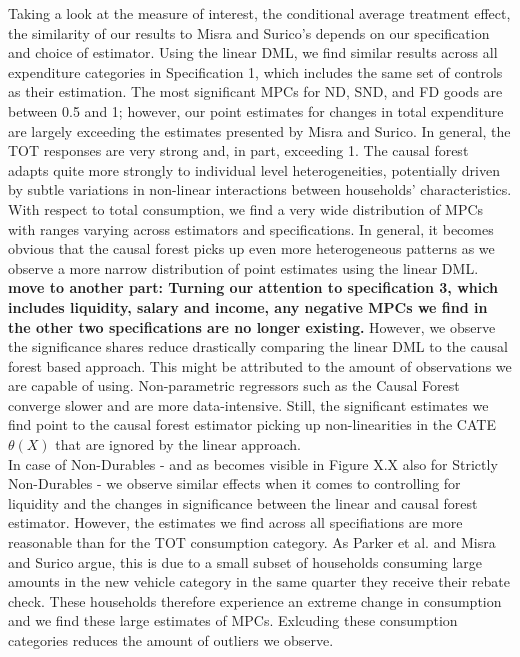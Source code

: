 Taking a look at the measure of interest, the conditional average treatment effect, the similarity of our results to Misra and Surico's depends on our specification and choice of estimator. Using the linear DML, we find similar results across all expenditure categories in Specification 1, which includes the same set of controls as their estimation. The most significant MPCs for ND, SND, and FD goods are between 0.5 and 1; however, our point estimates for changes in total expenditure are largely exceeding the estimates presented by Misra and Surico. In general, the TOT responses are very strong and, in part, exceeding 1. The causal forest adapts quite more strongly to individual level heterogeneities, potentially driven by subtle variations in non-linear interactions between households’ characteristics. \\
With respect to total consumption, we find a very wide distribution of MPCs with ranges varying across estimators and specifications. In general, it becomes obvious that the causal forest picks up even more heterogeneous patterns as we observe a more narrow distribution of point estimates using the linear DML. \textbf{move to another part: Turning our attention to specification 3, which includes liquidity, salary and income, any negative MPCs we find in the other two specifications are no longer existing.} However, we observe the significance shares reduce drastically comparing the linear DML to the causal forest based approach. This might be attributed to the amount of observations we are capable of using. Non-parametric regressors such as the Causal Forest converge slower and are more data-intensive. Still, the significant estimates we find point to the causal forest estimator picking up non-linearities in the CATE $\theta(X)$ that are ignored by the linear approach. \\
In case of Non-Durables - and as becomes visible in Figure X.X also for Strictly Non-Durables - we observe similar effects when it comes to controlling for liquidity and the changes in significance between the linear and causal forest estimator. However, the estimates we find across all specifiations are more reasonable than for the TOT consumption category. As Parker et al. and Misra and Surico argue, this is due to a small subset of households consuming large amounts in the new vehicle category in the same quarter they receive their rebate check. These households therefore experience an extreme change in consumption and we find these large estimates of MPCs. Exlcuding these consumption categories reduces the amount of outliers we observe. \\
